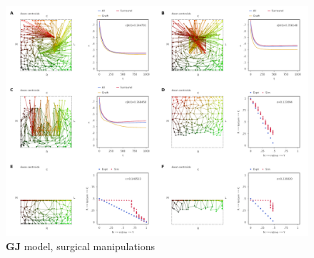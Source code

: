 \documentclass[11pt, a4paper]{article}
\begin{document}
\begin{figure}
\includegraphics[width=\linewidth]{./images/fig_GJ_surgical.png}
\caption{$\mathbf{GJ}$ model, surgical manipulations}
\label{f:GJsurg}
\end{figure}
\end{document}
